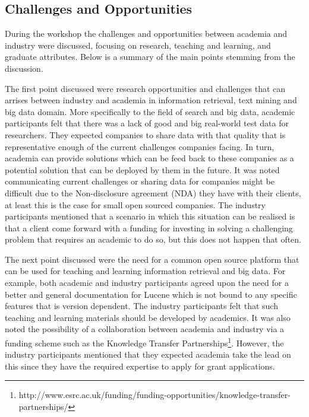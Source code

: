 
\subsection{Challenges and Opportunities}
During the workshop the challenges and opportunities between academia and industry were discussed, focusing on research, teaching and learning, and graduate attributes. Below is a summary of the main points stemming from the discussion.

The first point discussed were research opportunities and challenges that can arrises between industry and academia in information retrieval, text mining and big data domain. 
More specifically to the field of search and big data, academic participants felt that there was a lack of good and big real-world test data for researchers. 
They expected companies to share data with that quality that is representative enough of the current challenges companies facing. 
In turn, academia can provide solutions which can be feed back to these companies as a potential solution that can be deployed by them in the future.  
It was noted communicating current challenges or sharing data for companies might be difficult due to the Non-disclosure agreement (NDA) they have with their clients, at least this is the case for small open sourced companies. 
The industry participants mentioned that a scenario in which this situation can be realised is that a client come forward with a funding for investing in solving a challenging problem that requires an academic to do so, but this does not happen that often. 

The next point discussed were the need for a common open source platform that can be used for teaching and learning information retrieval and big data. 
For example, both academic and industry participants agreed upon the need for a better and general documentation for Lucene which is not bound to any specific features that is version dependent. 
The industry participants felt that such teaching and learning materials should be developed by academics. 
It was also noted the possibility of a collaboration between academia and industry via a funding scheme such as the Knowledge Transfer Partnerships\footnote{http://www.esrc.ac.uk/funding/funding-opportunities/knowledge-transfer-partnerships/}. 
However, the industry participants mentioned that they expected academia take the lead on this since they have the required expertise to apply for grant applications. 

